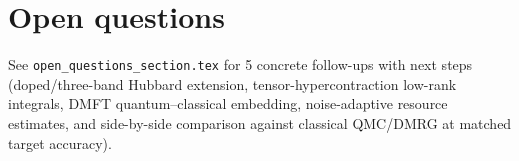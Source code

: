 \documentclass[11pt]{article}
\begin{document}
\section{Open questions}
See \texttt{open\_questions\_section.tex} for 5 concrete follow-ups with next steps
(doped/three-band Hubbard extension, tensor-hypercontraction low-rank integrals,
DMFT quantum--classical embedding, noise-adaptive resource estimates, and side-by-side
comparison against classical QMC/DMRG at matched target accuracy).
\end{document}

